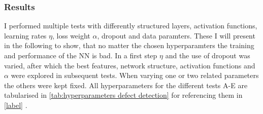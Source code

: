 \documentclass[11pt,a4paper]{article}
\begin{document}
\subsubsection{Results}
I performed multiple tests with differently structured layers, activation functions, learning rates $\eta$, loss weight $\alpha$, dropout and data paramters. 
These I will present in the following to show, that no matter the chosen hyperparamters the training and performance of the NN is bad. 
In a first step $\eta$ and the use of dropout was varied, after which the best features, network structure, activation functions and $\alpha$ were explored in subsequent tests. 
When varying one or two related parameters the others were kept fixed. 
All hyperparameters for the different tests A-E are tabularised in \autoref{tab:hyperparameters defect detection} for referencing them in \autoref{label} . 
\end{document}
